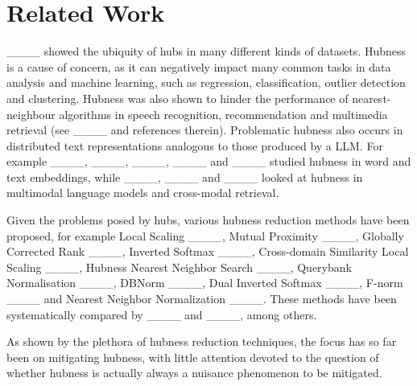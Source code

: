 \section{Related Work}
____ showed the ubiquity of hubs in many different kinds of datasets. 
Hubness is a cause of concern, as it can negatively impact many common tasks in data analysis and machine learning, such as regression, classification, outlier detection and clustering. Hubness was also shown to hinder the performance of nearest-neighbour algorithms in speech recognition, recommendation and multimedia retrieval (see ____ and references therein). Problematic hubness also occurs in distributed text representations analogous to those produced by a LLM. For example ____, ____, ____, ____ and ____ studied hubness in word and text embeddings, while ____, ____ and ____ looked at hubness in multimodal language models and cross-modal retrieval. 

Given the problems posed by hubs, various hubness reduction methods have been proposed, for example Local Scaling ____, Mutual Proximity ____, Globally Corrected Rank ____, Inverted Softmax ____, Cross-domain Similarity Local Scaling ____, Hubness Nearest Neighbor Search ____, Querybank Normalisation ____, DBNorm ____, Dual Inverted Softmax ____, F-norm ____ and Nearest Neighbor Normalization ____. These methods have been systematically compared by ____ and ____, among others. 

As shown by the plethora of hubness reduction techniques, the focus has so far been on mitigating hubness, with little attention devoted to the question of whether hubness is actually always a nuisance phenomenon to be mitigated.